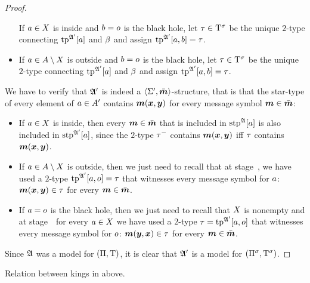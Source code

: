 \begin{proof}
\begin{itemize}
  If $a \in X$ is inside and $b = o$ is the black hole, let $\tau
  \in \mathrm{T}^{\sigma}$ be the unique $2$-type connecting $\operatorname{tp}^{\mathfrak{A'}}[a]$ and
  $\beta$ and assign $\operatorname{tp}^{\mathfrak{A'}}[a,b] = \tau$.
  \item[\refsticondOB]
  If $a \in A\setminus X$ is outside and $b = o$ is the black hole, let
  $\tau \in \mathrm{T}^{\sigma}$ be the unique $2$-type connecting $\operatorname{tp}^{\mathfrak{A'}}[a]$ and
  $\beta$ and assign $\operatorname{tp}^{\mathfrak{A'}}[a,b] = \tau$.
\end{itemize}
We have to verify that $\mathfrak{A'}$ is indeed a $\left\langle \mathrm{\Sigma'},\bar{\bm{m}} \right\rangle$-structure, that
is that the star-type of every element of $a \in A'$ contains
$\bm{m}(\bm{x},\bm{y})$ for every message symbol $\bm{m} \in \bar{\bm{m}}$:
\begin{itemize}
\item[\refsticondI] If $a \in X$ is inside, then every
$\bm{m} \in \bar{\bm{m}}$ that is included in $\operatorname{stp}^{\mathfrak{A}}[a]$ is also included in
$\operatorname{stp}^{\mathfrak{A'}}[a]$, since the $2$-type $\tau^{-}$ contains $\bm{m}(\bm{x},\bm{y})$ iff
$\tau$ contains $\bm{m}(\bm{x},\bm{y})$.
\item[\refsticondO] If $a \in A\setminus X$ is outside, then we just need to
recall that at stage~, we have used a $2$-type $\operatorname{tp}^{\mathfrak{A'}}[a,o]
= \tau$ that witnesses every message symbol for $a$: $\bm{m}(\bm{x},\bm{y}) \in
\tau$ for every $\bm{m} \in \bar{\bm{m}}$.
\item[\refsticondB] If $a = o$ is the black hole, then we just need to
recall that $X$ is nonempty and at stage~~for every $a \in
X$ we have used a $2$-type $\tau = \operatorname{tp}^{\mathfrak{A'}}[a,o]$ that witnesses every
message symbol for $o$: $\bm{m}(\bm{y},\bm{x}) \in \tau$ for every $\bm{m} \in \bar{\bm{m}}$.
\end{itemize}
Since $\mathfrak{A}$ was a model for $(\Pi,\mathrm{T})$, it is clear that $\mathfrak{A'}$ is a
model for $(\Pi^{\sigma},\mathrm{T}^{\sigma})$.
\end{proof}

\begin{remark}
Relation between kings in above.
\end{remark}

